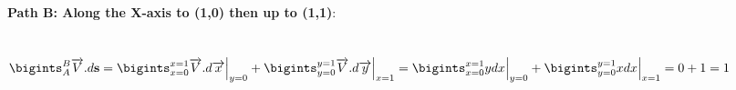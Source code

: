 \documentclass[fleqn]{article}
\begin{document}
\begin{enumerate}
      \textcolor{hwColor}{
        \textbf{Path B: Along the X-axis to (1,0) then up to (1,1)}: \\
        \\
        \\
        $
          \bigints_{A}^{B} \overrightarrow{V}.d\mathbf{s}=\bigints_{x=0}^{x=1} \overrightarrow{V}.d\overrightarrow{x}\Big|_{y=0}+\bigints_{y=0}^{y=1} \overrightarrow{V}.d\overrightarrow{y}\Big|_{x=1} \\
          \\
          =\bigints_{x=0}^{x=1} ydx\Big|_{y=0}+\bigints_{y=0}^{y=1} xdx \Big|_{x=1}=0+1=1 \\
        $
      }

  \end{enumerate}
\end{document}

